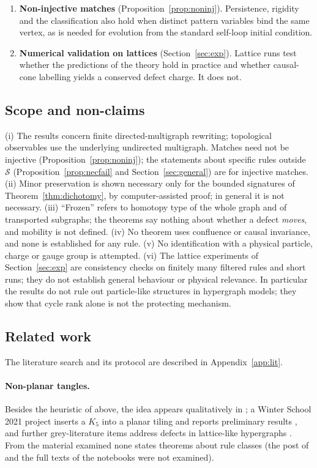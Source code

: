\documentclass[10pt]{article}
\theoremstyle{definition}
\theoremstyle{plain}
\theoremstyle{remark}
\begin{document}
\begin{enumerate}
\item \textbf{Non-injective matches} (Proposition~\ref{prop:noninj}). Persistence, rigidity and the classification also hold when distinct pattern variables bind the same vertex, as is needed for evolution from the standard self-loop initial condition.
\item \textbf{Numerical validation on lattices} (Section~\ref{sec:exp}). Lattice runs test whether the predictions of the theory hold in practice and whether causal-cone labelling yields a conserved defect charge. It does not.
\end{enumerate}

\subsection{Scope and non-claims}
(i) The results concern finite directed-multigraph rewriting; topological observables use the underlying undirected multigraph. Matches need not be injective (Proposition~\ref{prop:noninj}); the statements about specific rules outside $\mathcal S$ (Proposition~\ref{prop:necfail} and Section~\ref{sec:general}) are for injective matches. (ii) Minor preservation is shown necessary only for the bounded signatures of Theorem~\ref{thm:dichotomy}, by computer-assisted proof; in general it is not necessary. (iii) ``Frozen'' refers to homotopy type of the whole graph and of transported subgraphs; the theorems say nothing about whether a defect \emph{moves}, and mobility is not defined. (iv) No theorem uses confluence or causal invariance, and none is established for any rule. (v) No identification with a physical particle, charge or gauge group is attempted. (vi) The lattice experiments of Section~\ref{sec:exp} are consistency checks on finitely many filtered rules and short runs; they do not establish general behaviour or physical relevance. In particular the results do not rule out particle-like structures in hypergraph models; they show that cycle rank alone is not the protecting mechanism.

\subsection{Related work}
The literature search and its protocol are described in Appendix~\ref{app:lit}.

\paragraph{Non-planar tangles.} Besides the heuristic of \citet{gorard2020relativistic} above, the idea appears qualitatively in \citet{wolfram2020project,wolframtechintro}; a Winter School 2021 project inserts a $K_5$ into a planar tiling and reports preliminary results \citep{fischer2021obstructions}, and further grey-literature items address defects in lattice-like hypergraphs \citep{patarroyo2021defect,elastic2021}. From the material examined none states theorems about rule classes (the post of \citet{patarroyo2021defect} and the full texts of the notebooks were not examined).
\end{document}
